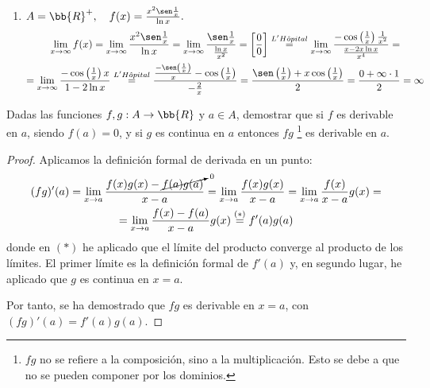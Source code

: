 \begin{ejercicio}
\begin{enumerate}
        \item $A = \bb{R}^+,\quad f(x)=\frac{x^2\sen\frac{1}{x}}{\ln{x}}.$
        \begin{multline*}
            \lim_{x\to \infty} f(x)
            = \lim_{x\to \infty}\frac{x^2\sen\frac{1}{x}}{\ln{x}}
            = \lim_{x\to \infty}\frac{\sen\frac{1}{x}}{\frac{\ln{x}}{x^2}} = \left[\frac{0}{0} \right]
            \stackrel{L'H\hat{o}pital}{=}
            \lim_{x\to \infty} \frac{-\cos\left(\frac{1}{x}\right)\frac{1}{x^2}}{\frac{x-2x\ln{x}}{x^4}}
            =\\=
            \lim_{x\to \infty} \frac{-\cos\left(\frac{1}{x}\right)x}{1-2\ln{x}}
            \stackrel{L'H\hat{o}pital}{=}
            \frac{\frac{-\sen\left(\frac{1}{x}\right)}{x}-\cos\left(\frac{1}{x}\right)}{-\frac{2}{x}}
            = \frac{\sen\left(\frac{1}{x}\right) +x\cos\left(\frac{1}{x}\right)}{2} = \frac{0+\infty\cdot 1}{2} =\infty
        \end{multline*}
    \end{enumerate}
\end{ejercicio}

\begin{ejercicio}
    Dadas las funciones $f,g:A\to \bb{R}$ y $a\in A$, demostrar que si $f$ es derivable en $a$, siendo $f(a)=0$, y si $g$ es continua en $a$ entonces $fg$ \footnote{$fg$ no se refiere a la composición, sino a la multiplicación. Esto se debe a que no se pueden componer por los dominios.} es derivable en $a$.
    \begin{proof}
        Aplicamos la definición formal de derivada en un punto:
        \begin{multline*}
            (fg)'(a)=\lim_{x\to a}\frac{f(x)g(x) - \cancelto{0}{f(a)g(a)}}{x-a}
            = \lim_{x\to a}\frac{f(x)g(x)}{x-a}
            = \lim_{x\to a}\frac{f(x)}{x-a} g(x)
            =\\=
            \lim_{x\to a}\frac{f(x)-f(a)}{x-a} g(x) \stackrel{(\ast)}{=} f'(a)g(a)
        \end{multline*}
        donde en $(\ast)$ he aplicado que el límite del producto converge al producto de los límites. El primer límite es la definición formal de $f'(a)$ y, en segundo lugar, he aplicado que $g$ es continua en $x=a$.
    
        Por tanto, se ha demostrado que $fg$ es derivable en $x=a$, con $(fg)'(a) = f'(a)g(a)$.
    \end{proof}
\end{ejercicio}

